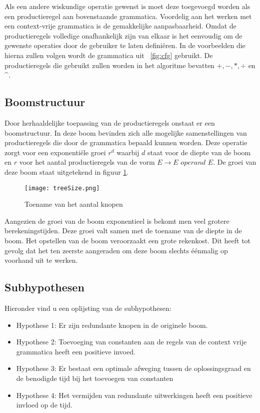 \documentclass[Main.tex]{subfiles}
\begin{document}
Als een andere wiskundige operatie gewenst is moet deze toegevoegd worden als een productieregel aan bovenstaande grammatica. Voordelig aan het werken met een context-vrije grammatica is de gemakkelijke aanpasbaarheid. Omdat de productieregels volledige onafhankelijk zijn van elkaar is het eenvoudig om de gewenste operaties door de gebruiker te laten defini\"eren. In de voorbeelden die hierna zullen volgen wordt de grammatica uit ~\ref{fig:cfg} gebruikt. De productieregels die gebruikt zullen worden in het algoritme bevatten $+, -, \ast, \div$ en \^{}.

\subsection{Boomstructuur}

Door herhaaldelijke toepassing van de productieregels onstaat er een boomstructuur. In deze boom bevinden zich alle mogelijke samenstellingen van productieregels die door de grammatica bepaald kunnen worden. Deze operatie zorgt voor een exponenti\"ele groei $r^{d}$ waarbij $d$ staat voor de diepte van de boom en $r$ voor het aantal productieregels van de vorm $E \rightarrow E$  $operand$ $ E$. De groei van deze boom staat uitgetekend in figuur \ref{fig:treeSize}.

\begin{figure}[!htb]
\centering
\texttt{[image: treeSize.png]}
\caption{Toename van het aantal knopen}
\label{fig:treeSize}
\end{figure}

Aangezien de groei van de boom exponentieel is bekomt men veel grotere berekeningstijden. Deze groei valt samen met de toename van de diepte in de boom. Het opstellen van de boom veroorzaakt een grote rekenkost. Dit heeft tot gevolg dat het ten zeerste aangeraden om deze boom slechts \'e\'enmalig op voorhand uit te werken.

\subsection{Subhypothesen}
\par Hieronder vind u een oplijsting van de subhypothesen:

\begin{itemize}
\item Hypothese 1: Er zijn redundante knopen in de originele boom.
\item Hypothese 2: Toevoeging van constanten aan de regels van de context vrije grammatica heeft een positieve invoed.
\item Hypothese 3: Er bestaat een optimale afweging tussen de oplossingsgraad en de benodigde tijd bij het toevoegen van constanten
\item Hypothese 4: Het vermijden van redundante uitwerkingen heeft een positieve invloed op de tijd. 
\end{itemize}
\end{document}
